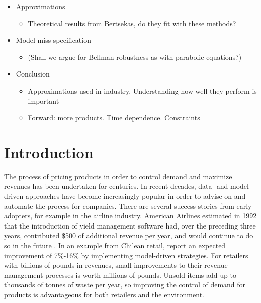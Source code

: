 \documentclass[main.tex]{subfiles}
\begin{document}
\listoftodos

\begin{itemize}
\item Approximations
  \begin{itemize}
  \item Theoretical results from Bertsekas, do they fit with these methods?
  \end{itemize}
\item Model miss-specification
  \begin{itemize}
  \item (Shall we argue for Bellman robustness as with parabolic equations?)
  \end{itemize}
\item Conclusion
  \begin{itemize}
  \item Approximations used in industry. Understanding how well they
    perform is important
  \item Forward: more products. Time dependence. Constraints
  \end{itemize}
\end{itemize}


\section{Introduction}
The process of pricing products in order to control demand and
maximize revenues has been undertaken for centuries. In recent
decades, data- and model-driven approaches have become increasingly
popular in order to advise on and automate the process for companies.
There are several success stories from early adopters, for example in
the airline industry. American Airlines estimated in 1992 that
the introduction of yield management software had, over the preceding
three years, contributed \$500 of additional revenue per year,
and would continue to do so in the future \citep{smith1992yield}.
In an example from Chilean retail, \citet{bitran1998coordinating}
report an expected improvement of 7\%-16\% by implementing
model-driven strategies.
For retailers with billions of pounds in revenues, small
improvements to their revenue-management processes is worth millions
of pounds.
Unsold items add up to thousands of tonnes of waste per year, so
improving the control of demand for products is advantageous
for both retailers and the environment.
\end{document}
